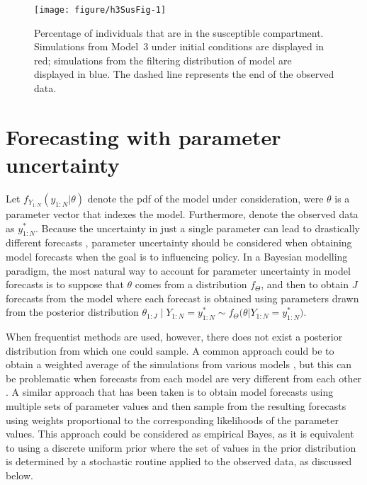 \begin{figure}[!ht]
\begin{knitrout}
\color{fgcolor}
\texttt{[image: figure/h3SusFig-1]} 
\end{knitrout}
\caption[Estimated susceptible population over time.]{\label{fig:h3Sus}Percentage of individuals that are in the susceptible compartment.
Simulations from Model~3 under initial conditions are displayed in red; simulations from the filtering distribution of model are displayed in blue.
The dashed line represents the end of the observed data.}
\end{figure}

\section{Forecasting with parameter uncertainty}\label{sec:appendix_haiti_uncertain}

Let $f_{Y_{1:N}}(y_{1:N} | \theta)$ denote the pdf of the model under consideration, were $\theta$ is a parameter vector that indexes the model.
Furthermore, denote the observed data as $y_{1:N}^*$.
Because the uncertainty in just a single parameter can lead to drastically different forecasts \cite{saltelli20},
parameter uncertainty should be considered when obtaining model forecasts when the goal is to influencing policy.
In a Bayesian modelling paradigm, the most natural way to account for parameter uncertainty in model forecasts is to suppose that $\theta$ comes from a distribution $f_{\Theta}$, and then to obtain $J$ forecasts from the model where each forecast is obtained using parameters drawn from the posterior distribution $\theta_{1:J} \mid Y_{1:N} = y_{1:N}^* \sim f_{\Theta}\big(\theta | Y_{1:N} = y_{1:N}^*\big)$.

When frequentist methods are used, however, there does not exist a posterior distribution from which one could sample.
A common approach could be to obtain a weighted average of the simulations from various models \cite{hoeting99}, but this can be problematic when forecasts from each model are very different from each other \cite{grueber11}.
A similar approach that has been taken \cite{king15} is to obtain model forecasts using multiple sets of parameter values and then sample from the resulting forecasts using weights proportional to the corresponding likelihoods of the parameter values.
This approach could be considered as empirical Bayes, as it is equivalent to using a discrete uniform prior where the set of values in the prior distribution is determined by a stochastic routine applied to the observed data, as discussed below.

